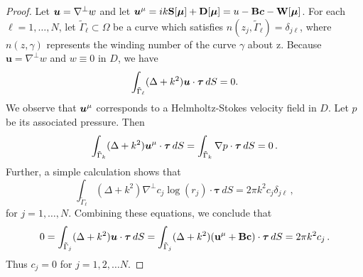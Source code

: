 \begin{proof}
Let ${\boldsymbol u} = \nabla^{\perp} w$ and let 
${\boldsymbol u}^{\mu} = ik \mathbf{S} [{\boldsymbol \mu}] + \mathbf{D}[{\boldsymbol \mu}] = u 
-\mathbf{B} {\boldsymbol c} - \mathbf{W}[{\boldsymbol \mu}]$.
For each $\ell = 1,\ldots,N$, 
let $\tilde{\Gamma}_{\ell} \subset \Omega$ be a curve which satisfies 
$n\left(z_{j}, \tilde{\Gamma}_{\ell}\right) = \delta_{j\ell}$, 
where $n\left(z,\gamma\right)$ represents the winding number 
of the curve $\gamma$ about z. 
Because $\mathbf{u} = \nabla^{\perp} w$ and $w\equiv 0$ in $D$,
we have 
\begin{equation}
\int_{\tilde{\Gamma}_\ell} (\Delta + k^2) {\boldsymbol u} \cdot \boldsymbol{\tau} \, dS = 0 .
\end{equation}
We observe that ${\boldsymbol u}^\mu$ corresponds
to a Helmholtz-Stokes velocity field in $D$. Let $p$ be 
its associated pressure. Then
\begin{equation}
\int_{\tilde{\Gamma}_k} (\Delta+k^2) {\boldsymbol u}^\mu 
\cdot \boldsymbol{\tau}
\, dS = \int_{\tilde{\Gamma}_k} \nabla p \cdot \boldsymbol{\tau} \, dS = 0 \, .
\end{equation}
Further, a simple calculation shows that 
\begin{equation}
\int_{\tilde{\Gamma}_\ell} (\Delta + k^{2}) \nabla^{\perp} c_j 
\log (r_j) \cdot \boldsymbol{\tau} \, dS = 
2 \pi k^2 c_{j} \delta_{j\ell} \, ,
\end{equation}
for $j = 1, \ldots, N$.
Combining these equations, we conclude that
\begin{equation}
0 = \int_{\tilde{\Gamma}_j} (\Delta +k^2) {\boldsymbol u} \cdot 
\boldsymbol{\tau} \, dS =
\int_{\tilde{\Gamma}_j} (\Delta +k^2)( \mathbf{u}^\mu + \mathbf{B}\mathbf{c} )
\cdot \boldsymbol{\tau} \, dS =  
2\pi k^2 c_j \, .
\end{equation}
Thus $c_j = 0$ for $j=1,2,\ldots N$.


\end{proof}
